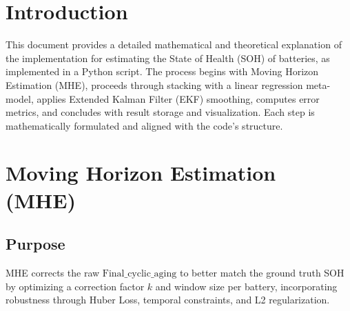 \section{Introduction}
This document provides a detailed mathematical and theoretical explanation of the implementation for estimating the State of Health (SOH) of batteries, as implemented in a Python script. The process begins with Moving Horizon Estimation (MHE), proceeds through stacking with a linear regression meta-model, applies Extended Kalman Filter (EKF) smoothing, computes error metrics, and concludes with result storage and visualization. Each step is mathematically formulated and aligned with the code's structure.

\section{Moving Horizon Estimation (MHE)}

\subsection{Purpose}
MHE corrects the raw \(\text{Final_cyclic_aging}\) to better match the ground truth SOH by optimizing a correction factor \(k\) and window size per battery, incorporating robustness through Huber Loss, temporal constraints, and L2 regularization.

